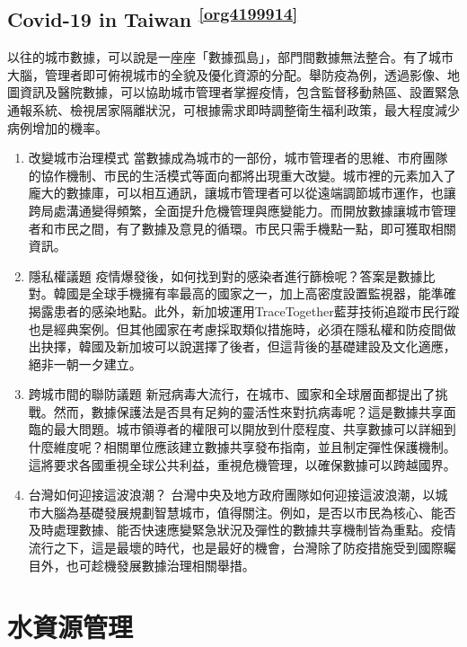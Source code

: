 \documentclass[a4paper,12pt]{article}
\begin{document}
\subsection{Covid-19 in Taiwan \textsuperscript{\ref{org4199914}}}
\label{sec:orgd056f91}
以往的城市數據，可以說是一座座「數據孤島」，部門間數據無法整合。有了城市大腦，管理者即可俯視城市的全貌及優化資源的分配。舉防疫為例，透過影像、地圖資訊及醫院數據，可以協助城市管理者掌握疫情，包含監督移動熱區、設置緊急通報系統、檢視居家隔離狀況，可根據需求即時調整衛生福利政策，最大程度減少病例增加的機率。\\
\begin{enumerate}
\item 改變城市治理模式
\label{sec:org317c9df}
當數據成為城市的一部份，城市管理者的思維、市府團隊的協作機制、市民的生活模式等面向都將出現重大改變。城市裡的元素加入了龐大的數據庫，可以相互通訊，讓城市管理者可以從遠端調節城市運作，也讓跨局處溝通變得頻繁，全面提升危機管理與應變能力。而開放數據讓城市管理者和市民之間，有了數據及意見的循環。市民只需手機點一點，即可獲取相關資訊。\\
\item 隱私權議題
\label{sec:org114aa20}
疫情爆發後，如何找到對的感染者進行篩檢呢？答案是數據比對。韓國是全球手機擁有率最高的國家之一，加上高密度設置監視器，能準確揭露患者的感染地點。此外，新加坡運用TraceTogether藍芽技術追蹤市民行蹤也是經典案例。但其他國家在考慮採取類似措施時，必須在隱私權和防疫間做出抉擇，韓國及新加坡可以說選擇了後者，但這背後的基礎建設及文化適應，絕非一朝一夕建立。\\
\item 跨城市間的聯防議題
\label{sec:orgefec041}
新冠病毒大流行，在城市、國家和全球層面都提出了挑戰。然而，數據保護法是否具有足夠的靈活性來對抗病毒呢？這是數據共享面臨的最大問題。城市領導者的權限可以開放到什麼程度、共享數據可以詳細到什麼維度呢？相關單位應該建立數據共享發布指南，並且制定彈性保護機制。這將要求各國重視全球公共利益，重視危機管理，以確保數據可以跨越國界。\\
\item 台灣如何迎接這波浪潮？
\label{sec:org971d81f}
台灣中央及地方政府團隊如何迎接這波浪潮，以城市大腦為基礎發展規劃智慧城市，值得關注。例如，是否以市民為核心、能否及時處理數據、能否快速應變緊急狀況及彈性的數據共享機制皆為重點。疫情流行之下，這是最壞的時代，也是最好的機會，台灣除了防疫措施受到國際矚目外，也可趁機發展數據治理相關舉措。\\
\newpage
\end{enumerate}

\section{水資源管理}
\label{sec:org260755c}
\end{document}
